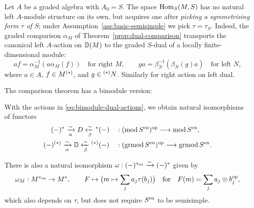 \begin{advanced}[suppressfirstparskip=true,innertopmargin=0pt]
\begin{remark}\label{rem:transported-dual-action}
Let $A$ be a graded algebra with $A_0=S$.
The space $\operatorname{Hom}\nolimits_S(M,S)$ has no natural left $A$-module structure on its own, but acquires one after \emph{picking a symmetrising form $\tau$ of $S$}; under Assumption~\ref{ass:basic-semisimple} we pick $\tau=\tau_S$.
Indeed, the graded comparison $\alpha_M$ of Theorem~\ref{prop:dual-comparison} transports the canonical left $A$-action on $\mathbb{D}(M)$ to the graded $S$-dual of a locally finite-dimensional module:
\[
af=\alpha_M^{-1}(a\alpha_M(f))\quad\text{for right }M,
\qquad ga=\beta_N^{-1}(\beta_N(g)a)\quad\text{for left }N,
\]
where $a\in A$, $f\in M^{(*)}$, and $g\in{}^{(*)}N$.
Similarly for right action on left dual.
\end{remark}


The comparison theorem has a bimodule version:

\begin{theorem}
With the actions in \eqref{eq:bimodule-dual-actions}, we obtain natural isomorphisms of functors
\begin{equation}\label{eq:bimodule-dual-comparison}
\begin{aligned}
(-)^*\xrightarrow[\alpha]{\sim}D\xleftarrow[\beta]{\sim}{}^*(-)
&\quad:(\operatorname{\mathrm{mod}} S^{\mathrm{en}})^{\mathrm{op}}\longrightarrow\operatorname{\mathrm{mod}} S^{\mathrm{en}},\\
(-)^{(*)}\xrightarrow[\alpha]{\sim}\mathbb{D}\xleftarrow[\beta]{\sim}{}^{(*)}(-)
&\quad:(\operatorname{\mathrm{grmod}} S^{\mathrm{en}})^{\mathrm{op}}\longrightarrow\operatorname{\mathrm{grmod}} S^{\mathrm{en}}.
\end{aligned}
\end{equation}

There is also a natural isomorphism $\omega:(-)^{*_{\mathrm{en}}}\xrightarrow{\sim}(-)^*$ given by
\begin{equation}\label{eq:en-dual-comparison}
\omega_M:M^{*_{\mathrm{en}}}\to M^*, \qquad F\mapsto \big(m\mapsto \sum_j a_j\tau(b_j)\big)
\quad\text{for}\quad
F(m)=\sum_j a_j\otimes b_j^{\mathrm{op}},
\end{equation}
which also depends on $\tau$, but does not require $S^{\mathrm{en}}$ to be semisimple.


\end{theorem}
\end{advanced}
